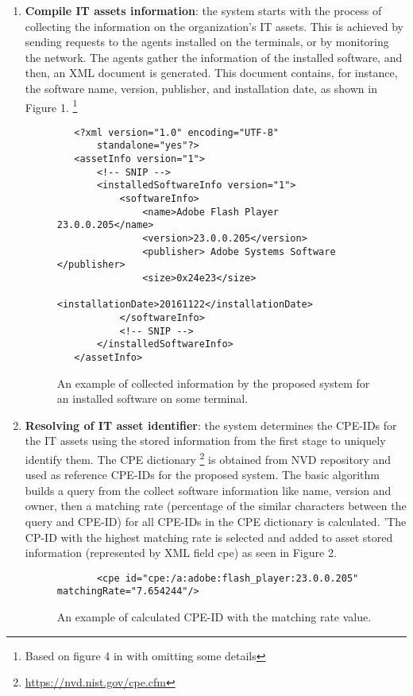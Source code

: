\documentclass{llncs}
\begin{document}
\begin{enumerate}
 \item \textbf{Compile IT assets information}: the system starts with the process of collecting the information on the organization's IT assets. This is achieved by sending requests to the agents installed on the terminals, or by monitoring the network. The agents gather the information of the installed software, and then, an XML document is generated. This document contains, for instance, the software name, version, publisher, and installation date, as shown in Figure 1.  \footnote{Based on figure 4 in \cite{paper1} with omitting some details} 

 \begin{figure}
 \centering
   \lstset{language=XML}
    \begin{lstlisting}
   <?xml version="1.0" encoding="UTF-8"
       standalone="yes"?>
   <assetInfo version="1">
       <!-- SNIP -->
       <installedSoftwareInfo version="1">
           <softwareInfo>
               <name>Adobe Flash Player 23.0.0.205</name>
               <version>23.0.0.205</version>
               <publisher> Adobe Systems Software </publisher>
               <size>0x24e23</size>
               <installationDate>20161122</installationDate>
           </softwareInfo>
           <!-- SNIP -->
       </installedSoftwareInfo>
   </assetInfo>
    \end{lstlisting}
   \caption{An example of collected information by the proposed system for an installed software on some terminal.}
    \end{figure}
   
   
   \item \textbf{Resolving of IT asset identifier}: the system determines the CPE-IDs for the IT assets using the stored information from the first stage to uniquely identify them. The CPE dictionary \footnote{\url{https://nvd.nist.gov/cpe.cfm}} is obtained from NVD repository and used as reference CPE-IDs for the proposed system. The basic algorithm builds a query from the collect software information like name, version and owner, then a matching rate (percentage of the similar characters between the query and CPE-ID) for all CPE-IDs in the CPE dictionary is calculated. '\newpage The CP-ID with the highest matching rate is selected and added to asset stored information (represented by XML field cpe) as seen in Figure 2.
   
    \begin{figure}
    \centering
      \lstset{language=XML}
       \begin{lstlisting} 
       <cpe id="cpe:/a:adobe:flash_player:23.0.0.205" matchingRate="7.654244"/>
       \end{lstlisting}
      \caption{An example of calculated CPE-ID with the matching rate value.}
       \end{figure}
      

\end{enumerate}
\end{document}
